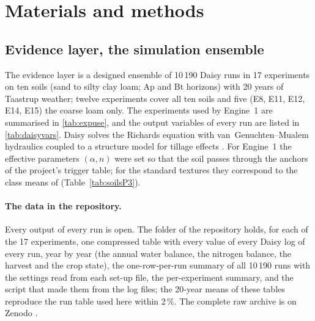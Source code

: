 \section{Materials and methods}
\label{sec:methods}
\subsection{Evidence layer, the simulation ensemble}
The evidence layer is a designed ensemble of 10\,190 Daisy runs \citep{Hansen2012,Holbak2026} in 17 experiments on ten soils (sand to silty clay loam; Ap and Bt horizons) with 20 years of Taastrup weather; twelve experiments cover all ten soils and five (E8, E11, E12, E14, E15) the coarse loam only. The experiments used by Engine~1 are summarised in \cref{tab:expuse}, and the output variables of every run are listed in \cref{tab:daisyvars}. Daisy solves the Richards equation with van~Genuchten--Mualem hydraulics \citep{vanGenuchten1980,Mualem1976} coupled to a structure model for tillage effects \citep{Flanagan1995}. For Engine~1 the effective parameters $(\alpha,n)$ were set so that the soil passes through the anchors of the project's trigger table; for the standard textures they correspond to the class means of \citet{Carsel1988} (Table~\ref{tab:soilsP3}).

\paragraph{The data in the repository.} Every output of every run is open. The folder \cslink{} of the repository holds, for each of the 17 experiments, one compressed table with every value of every Daisy log of every run, year by year (the annual water balance, the nitrogen balance, the harvest and the crop state), the one-row-per-run summary of all 10\,190 runs with the settings read from each set-up file, the per-experiment summary, and the script that made them from the log files; the 20-year means of these tables reproduce the run table used here within 2\,\%. The complete raw archive is on Zenodo \citep{HaliluData}.




